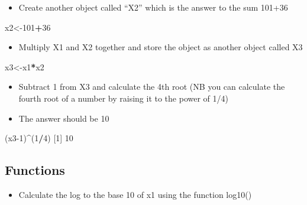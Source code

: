 \documentclass[
]{book}
\newenvironment{Shaded}{\begin{snugshade}}{\end{snugshade}}
\newcommand{\DecValTok}[1]{\textcolor[rgb]{0.00,0.00,0.81}{#1}}
\newcommand{\NormalTok}[1]{#1}
\newcommand{\OperatorTok}[1]{\textcolor[rgb]{0.81,0.36,0.00}{\textbf{#1}}}
\providecommand{\tightlist}{%
  \setlength{\itemsep}{0pt}\setlength{\parskip}{0pt}}
\begin{document}
\begin{itemize}
\tightlist
\item
  Create another object called ``X2'' which is the answer to the sum 101+36
\end{itemize}

\begin{Shaded}
\begin{Highlighting}[]
\NormalTok{x2<-}\DecValTok{101}\OperatorTok{+}\DecValTok{36}      
\end{Highlighting}
\end{Shaded}

\begin{itemize}
\tightlist
\item
  Multiply X1 and X2 together and store the object as another object called X3
\end{itemize}

\begin{Shaded}
\begin{Highlighting}[]
\NormalTok{x3<-x1}\OperatorTok{*}\NormalTok{x2    }
\end{Highlighting}
\end{Shaded}

\begin{itemize}
\item
  Subtract 1 from X3 and calculate the 4th root (NB you can calculate the fourth root of a number by raising it to the power of 1/4)
\item
  The answer should be 10
\end{itemize}

\begin{Shaded}
\begin{Highlighting}[]
\NormalTok{(x3}\DecValTok{-1}\NormalTok{)}\OperatorTok{^}\NormalTok{(}\DecValTok{1}\OperatorTok{/}\DecValTok{4}\NormalTok{)}
\NormalTok{[}\DecValTok{1}\NormalTok{] }\DecValTok{10}
\end{Highlighting}
\end{Shaded}

\hypertarget{functions-2}{%
\subsection{Functions}\label{functions-2}}

\begin{itemize}
\tightlist
\item
  Calculate the log to the base 10 of x1 using the function log10()
\end{itemize}
\end{document}
